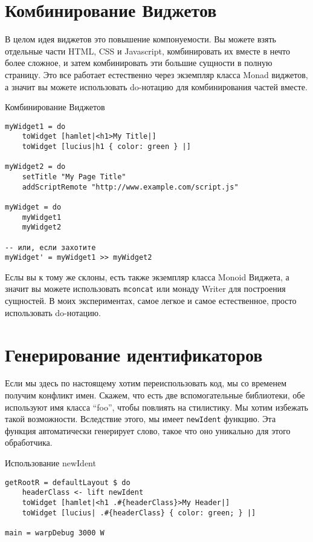 \section{Комбинирование Виджетов}

В целом идея виджетов это повышение компонуемости. Вы можете взять отдельные части HTML, CSS и Javascript, комбинировать их вместе в нечто более сложное, и затем комбинировать эти большие сущности в полную страницу. Это все работает естественно через экземпляр класса Monad виджетов, а значит вы можете использовать do-нотацию для комбинирования частей вместе.

Комбинирование Виджетов

\begin{lstlisting}
myWidget1 = do
    toWidget [hamlet|<h1>My Title|]
    toWidget [lucius|h1 { color: green } |]

myWidget2 = do
    setTitle "My Page Title"
    addScriptRemote "http://www.example.com/script.js"

myWidget = do
    myWidget1
    myWidget2

-- или, если захотите
myWidget' = myWidget1 >> myWidget2
\end{lstlisting}

Еслы вы к тому же склоны, есть также экземпляр класса Monoid Виджета, а значит вы можете использовать \lstinline'mconcat' или монаду Writer для построения сущностей. В моих экспериментах, самое легкое и самое естественное, просто использовать do-нотацию.

\section{Генерирование идентификаторов}

Если мы здесь по настоящему хотим переиспользовать код, мы со временем получим конфликт имен. Скажем, что есть две вспомогательные библиотеки, обе используют имя класса \textquotedblleft foo\textquotedblright, чтобы повлиять на стилистику. Мы хотим избежать такой возможности. Вследствие этого, мы имеет \lstinline'newIdent' функцию.  Эта функция автоматически генерирует слово, такое что оно уникально для этого обработчика.

Использование newIdent

\begin{lstlisting}
getRootR = defaultLayout $ do
    headerClass <- lift newIdent
    toWidget [hamlet|<h1 .#{headerClass}>My Header|]
    toWidget [lucius| .#{headerClass} { color: green; } |]

main = warpDebug 3000 W
\end{lstlisting}

